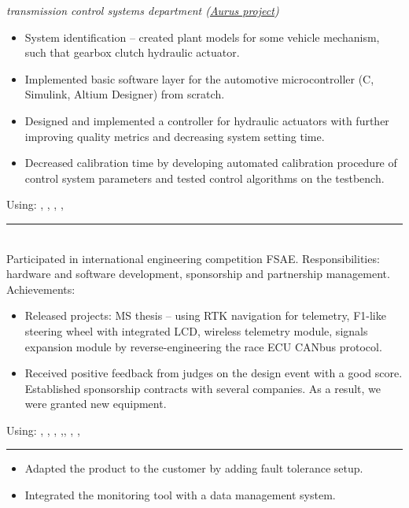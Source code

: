 \textit{transmission control systems department (\href{https://en.wikipedia.org/wiki/Aurus_Senat}{Aurus project})}
\begin{itemize}
    \item System identification -- created plant models for some vehicle mechanism, such that gearbox clutch hydraulic actuator.
    \item Implemented basic software layer for the automotive microcontroller (C, Simulink, Altium Designer) from scratch.
    \item Designed and implemented a controller for hydraulic actuators with further improving quality metrics and decreasing system setting time.
    \item Decreased calibration time by developing automated calibration procedure of control system parameters and tested control algorithms on the testbench.
\end{itemize}
Using: , , , , 
\par\noindent\rule{\textwidth}{0.4pt}
% 
 \\
Participated in international engineering competition FSAE.
Responsibilities: hardware and software development, sponsorship and partnership management.
Achievements:
\begin{itemize}
    \item Released projects: MS thesis -- using RTK navigation for telemetry, F1-like steering wheel with integrated LCD, wireless telemetry module, signals expansion module by reverse-engineering the race ECU CANbus protocol.
    \item Received positive feedback from judges on the design event with a good score. Established sponsorship contracts with several companies. As a result, we were granted new equipment.
\end{itemize}
Using: , , , ,, , , 
\par\noindent\rule{\textwidth}{0.4pt}
% 
\begin{itemize}
    \item Adapted the product to the customer by adding fault tolerance setup.
    \item Integrated the monitoring tool with a data management system.
\end{itemize}
